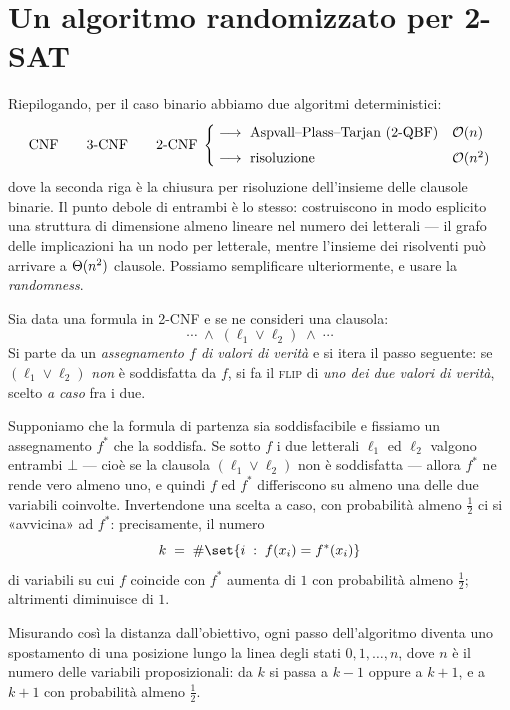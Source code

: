 \section{Un algoritmo randomizzato per 2-SAT}

Riepilogando, per il caso binario abbiamo due algoritmi deterministici:
\[
  \text{CNF}\qquad \text{3-CNF}\qquad \text{2-CNF}
  \;\begin{cases}
    \;\longrightarrow\ \text{Aspvall--Plass--Tarjan (2-QBF)} & \mathcal{O}(n)\\[4pt]
    \;\longrightarrow\ \text{risoluzione} & \mathcal{O}(n^{2})
  \end{cases}
\]
dove la seconda riga è la chiusura per risoluzione dell'insieme delle clausole binarie. Il
punto debole di entrambi è lo stesso: costruiscono in modo esplicito una struttura di
dimensione almeno lineare nel numero dei letterali --- il grafo delle implicazioni ha un nodo
per letterale, mentre l'insieme dei risolventi può arrivare a $\Theta(n^{2})$ clausole.
Possiamo semplificare ulteriormente, e usare la \emph{randomness}.

Sia data una formula in 2-CNF e se ne consideri una clausola:
\[
  \cdots\;\wedge\;(\ell_1\vee\ell_2)\;\wedge\;\cdots
\]
Si parte da un \emph{assegnamento $f$ di valori di verità} e si itera il passo seguente: se
$(\ell_1\vee\ell_2)$ \emph{non} è soddisfatta da $f$, si fa il \textsc{flip} di \emph{uno dei
due valori di verità}, scelto \emph{a caso} fra i due.

\begin{osservazione}
Supponiamo che la formula di partenza sia soddisfacibile e fissiamo un assegnamento $f^{*}$
che la soddisfa. Se sotto $f$ i due letterali $\ell_1$ ed $\ell_2$ valgono entrambi $\bot$
--- cioè se la clausola $(\ell_1\vee\ell_2)$ non è soddisfatta --- allora $f^{*}$ ne rende
vero almeno uno, e quindi $f$ ed $f^{*}$ differiscono su almeno una delle due variabili
coinvolte. Invertendone una scelta a caso, con probabilità almeno $\tfrac12$ ci si
«avvicina» ad $f^{*}$: precisamente, il numero
\[
  k \;=\; \#\set{i \;:\; f(x_i)=f^{*}(x_i)}
\]
di variabili su cui $f$ coincide con $f^{*}$ aumenta di $1$ con probabilità almeno
$\tfrac12$; altrimenti diminuisce di $1$.
\end{osservazione}

Misurando così la distanza dall'obiettivo, ogni passo dell'algoritmo diventa uno spostamento
di una posizione lungo la linea degli stati $0,1,\dots,n$, dove $n$ è il numero delle
variabili proposizionali: da $k$ si passa a $k-1$ oppure a $k+1$, e a $k+1$ con probabilità
almeno $\tfrac12$.


